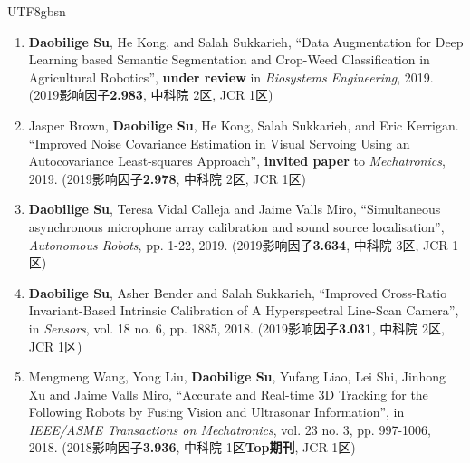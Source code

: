 \documentclass[margin,line]{res}
\begin{document}
\begin{CJK*}{UTF8}{gbsn}
\begin{resume}
\begin{enumerate}
\item \textbf{Daobilige Su}, He Kong, and Salah Sukkarieh, ``Data Augmentation for Deep Learning based Semantic Segmentation and Crop-Weed Classification in Agricultural Robotics'', \textbf{under review} in \textit{Biosystems Engineering}, 2019. (2019影响因子\textbf{2.983}, 中科院 2区, JCR 1区)

\item Jasper Brown, \textbf{Daobilige Su}, He Kong, Salah Sukkarieh, and Eric Kerrigan. ``Improved Noise Covariance Estimation in Visual Servoing Using an Autocovariance Least-squares Approach'', \textbf{invited paper} to \textit{Mechatronics}, 2019. (2019影响因子\textbf{2.978}, 中科院 2区, JCR 1区)

\item {\bf Daobilige Su}, Teresa Vidal Calleja and Jaime Valls Miro, ``Simultaneous asynchronous microphone array calibration and sound source localisation'', {\it Autonomous Robots}, pp. 1-22, 2019. (2019影响因子\textbf{3.634}, 中科院 3区, JCR 1区)


\item {\bf Daobilige Su}, Asher Bender and Salah Sukkarieh, ``Improved Cross-Ratio Invariant-Based Intrinsic Calibration of A Hyperspectral Line-Scan Camera'', in {\it Sensors}, vol. 18 no. 6, pp. 1885, 2018. (2019影响因子\textbf{3.031}, 中科院 2区, JCR 1区)

\item Mengmeng Wang, Yong Liu, {\bf Daobilige Su}, Yufang Liao, Lei Shi, Jinhong Xu and Jaime Valls Miro, ``Accurate and Real-time 3D Tracking for the Following Robots by Fusing Vision and Ultrasonar Information'', in {\it IEEE/ASME Transactions on Mechatronics}, vol. 23 no. 3, pp. 997-1006, 2018. (2018影响因子\textbf{3.936}, 中科院 1区{\bf Top期刊}, JCR 1区)
\end{enumerate}


\end{resume}
\end{CJK*}
\end{document}
